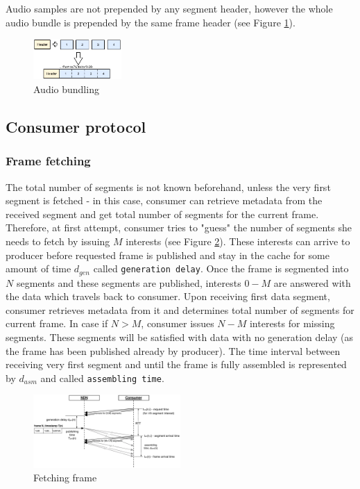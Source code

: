 \documentclass[10pt]{proc}
\begin{document}
Audio samples are not prepended by any segment header, however the whole audio bundle is prepended by the same frame header (see Figure \ref{fig:audio-bundling}).

\begin{figure}[Ht!]
\centering
\includegraphics[width=0.3\textwidth]{audio-bundling}
\caption{Audio bundling}
\label{fig:audio-bundling}
\end{figure}


\subsection{Consumer protocol}

\subsubsection{Frame fetching}

The total number of segments is not known beforehand, unless the very first segment is fetched - in this case, consumer can retrieve metadata from the received segment and get total number of segments for the current frame. 
Therefore, at first attempt, consumer tries to "guess" the number of segments she needs to fetch by issuing $M$ interests (see Figure \ref{fig:pull}). These interests can arrive to producer before requested frame is published and stay in the cache for some amount of time $d_{gen}$ called \texttt{generation delay}. Once the frame is segmented into $N$ segments and these segments are published, interests $0 - M$ are answered with the data which travels back to consumer. Upon receiving first data segment, consumer retrieves metadata from it and determines total number of segments for current frame. In case if $N > M$, consumer issues $N - M$ interests for missing segments. These segments will be satisfied with data with no generation delay (as the frame has been published already by producer). The time interval between receiving very first segment and until the frame is fully assembled is represented by $d_{asm}$ and called \texttt{assembling time}.

\begin{figure}[Ht!]
\centering
\includegraphics[width=0.5\textwidth]{frame-fetch}
\caption{Fetching frame}
\label{fig:pull}
\end{figure}
\end{document}
